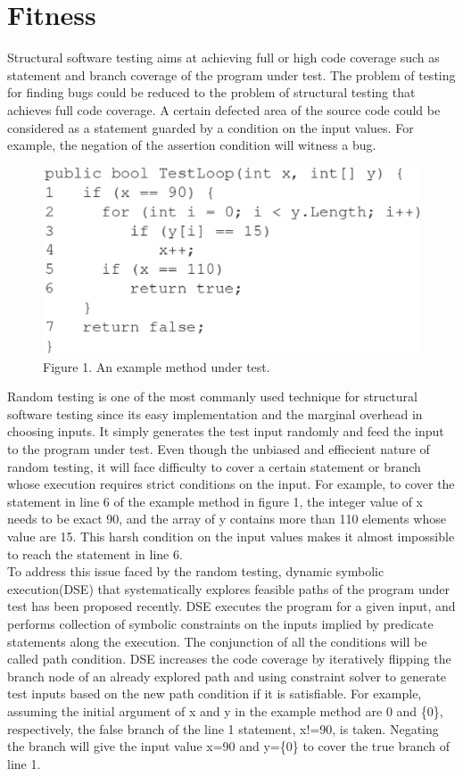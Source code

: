 \section{Fitness}
\indent Structural software testing aims at achieving full or high code coverage such as statement and branch coverage of the program under test. The problem of testing for finding bugs could be reduced to the problem of structural testing that achieves full code coverage. A certain defected area of the source code could be considered as a statement guarded by a condition on the input values. For example, the negation of the assertion condition will witness a bug.\\
\begin{figure}[b]
\centering
\includegraphics[scale=0.7]{fig/XiFitnessEPS.eps}
\caption{Figure 1. An example method under test.}
\end{figure}
\indent Random testing is one of the most commanly used technique for structural software testing since its easy implementation and the marginal overhead in choosing inputs. It simply generates the test input randomly and feed the input to the program under test. Even though the unbiased and effiecient nature of random testing, it will face difficulty to cover a certain statement or branch whose execution requires strict conditions on the input. For example, to cover the statement in line 6 of the example method in figure 1, the integer value of x needs to be exact 90, and the array of y contains more than 110 elements whose value are 15. This harsh condition on the input values makes it almost impossible to reach the statement in line 6.\\
\indent To address this issue faced by the random testing, dynamic symbolic execution(DSE) that systematically explores feasible paths of the program under test has been proposed recently. DSE executes the program for a given input, and performs collection of symbolic constraints on the inputs implied by predicate statements along the execution. The conjunction of all the conditions will be called path condition. DSE increases the code coverage by iteratively flipping the branch node of an already explored path and using constraint solver to generate test inputs based on the new path condition if it is satisfiable. For example, assuming the initial argument of x and y in the example method are 0 and \{0\}, respectively, the false branch of the line 1 statement, x!=90, is taken. Negating the branch will give the input value x=90 and y=\{0\} to cover the true branch of line 1. \\
